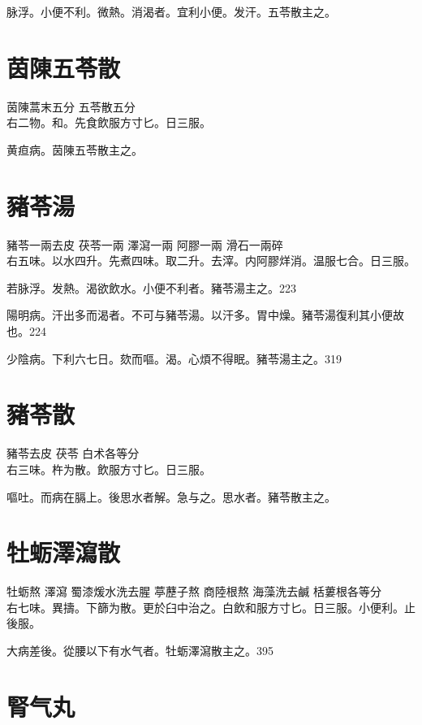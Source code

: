 脉浮。小便不利。微熱。消渴者。宜利小便。发汗。五苓散主之。

\section{茵陳五苓散}

茵陳蒿末{\scriptsize 五分} 五苓散{\scriptsize 五分}\\
右二物。和。先食飲服方寸匕。日三服。

黄疸病。茵陳五苓散主之。

\section{豬苓湯}

豬苓{\scriptsize\khaai 一兩去皮}{ }茯苓{\scriptsize 一兩}{ }澤瀉{\scriptsize 一兩}{ }阿膠{\scriptsize 一兩}{ }滑石{\scriptsize 一兩碎}\\
右五味。以水四升。先煮四味。取二升。去滓。内阿膠烊消。温服七合。日三服。

若脉浮。发熱。渴欲飲水。小便不利者。豬苓湯主之。223

陽明病。汗出多而渴者。不可与豬苓湯。以汗多。胃中燥。豬苓湯復利其小便故也。224

少陰病。下利六七日。欬而嘔。渴。心煩不得眠。豬苓湯主之。319

\section{豬苓散}

豬苓{\scriptsize\khaai 去皮} 茯苓{ }白术{\scriptsize 各等分}\\
右三味。杵为散。飲服方寸匕。日三服。

嘔吐。而病在膈上。後思水者解。急与之。思水者。豬苓散主之。

\section{牡蛎澤瀉散}

牡蛎{\scriptsize 熬} 澤瀉 蜀漆{\scriptsize 煖水洗去腥} 葶藶子{\scriptsize 熬} 商陸根{\scriptsize 熬} 海藻{\scriptsize 洗去鹹} 栝蔞根{\scriptsize 各等分}\\
右七味。異擣。下篩为散。更於臼中治之。白飲和服方寸匕。日三服。小便利。止後服。

大病差後。從腰以下有水气者。牡蛎澤瀉散主之。395

\section{腎气丸}

